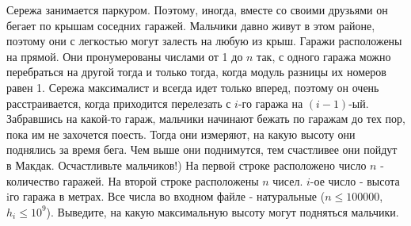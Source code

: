 Сережа занимается паркуром. Поэтому, иногда, вместе со своими друзьями он бегает по крышам соседних гаражей. 
Мальчики давно живут в этом районе, поэтому они с легкостью могут залесть на любую из крыш. Гаражи расположены на прямой. 
Они пронумерованы числами от 1 до $n$ так, с одного гаража можно перебраться на другой тогда и только тогда, когда модуль
разницы их номеров равен 1. Сережа максималист и всегда идет только вперед, поэтому он очень расстраивается, 
когда приходится перелезать с $i$-го гаража на $(i - 1)$-ый. 
Забравшись на какой-то гараж, мальчики начинают бежать по гаражам до тех пор, 
пока им не захочется поесть. Тогда они измеряют, на какую высоту они поднялись за время бега. Чем выше они поднимутся, 
тем счастливее они пойдут в Макдак. Осчастливьте мальчиков!)
\InputFile
На первой строке расположено число $n$ - количество гаражей.
На второй строке расположены $n$ чисел. $i$-ое число - высота iго гаража в метрах.
Все числа во входном файле - натуральные ($n \le 100000$, $h_i \le 10^9$).
\OutputFile
Выведите, на какую максимальную высоту могут подняться мальчики.

